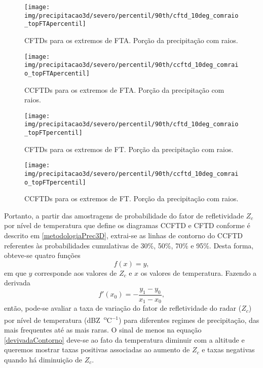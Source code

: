 \begin{sidewaysfigure}%
\centering
\texttt{[image: img/precipitacao3d/severo/percentil/90th/cftd\_10deg\_comraio\_topFTApercentil]}
\caption{CFTDs para os extremos de FTA. Porção da precipitação com raios.}
\label{cftd_fta_com}
\end{sidewaysfigure} 

\begin{sidewaysfigure}%
\centering
\texttt{[image: img/precipitacao3d/severo/percentil/90th/ccftd\_10deg\_comraio\_topFTApercentil]}
\caption{CCFTDs para os extremos de FTA. Porção da precipitação com raios.}
\label{ccftd_fta_com}
\end{sidewaysfigure} 

\begin{sidewaysfigure}%
\centering
\texttt{[image: img/precipitacao3d/severo/percentil/90th/cftd\_10deg\_comraio\_topFTpercentil]}
\caption{CFTDs para os extremos de FT. Porção da precipitação com raios.}
\label{cftd_ft_com}
\end{sidewaysfigure} 

\begin{sidewaysfigure}%
\centering
\texttt{[image: img/precipitacao3d/severo/percentil/90th/ccftd\_10deg\_comraio\_topFTpercentil]}
\caption{CCFTDs para os extremos de FT. Porção da precipitação com raios.}
\label{ccftd_ft_com}
\end{sidewaysfigure} 

Portanto, a partir das amostragens de probabilidade do fator de refletividade $Z_c$ por nível de temperatura que define os diagramas CCFTD e CFTD conforme é descrito em \ref{metodologiaPrec3D},  extrai-se as linhas de contorno do CCFTD referentes às probabilidades cumulativas de 30\%, 50\%, 70\% e 95\%. Desta forma, obteve-se quatro funções 
\begin{equation}
f(x)=y ,
\end{equation} 
em que $y$ corresponde aos valores de $Z_c$ e $x$ os valores de temperatura. Fazendo a derivada 
\begin{equation}
f'(x_0)= - \dfrac{y_1 - y_0}{x_1 - x_0},
\label{devivadaContorno}
\end{equation}
então, pode-se avaliar a taxa de variação do fator de refletividade do radar ($Z_c$) por nível de temperatura (dBZ~\textsuperscript{o}C$^{-1}$) para diferentes regimes de precipitação, das mais frequentes até as mais raras. O sinal de menos na equação \ref{devivadaContorno} deve-se ao fato da temperatura diminuir com a altitude e queremos mostrar taxas positivas associadas ao aumento de $Z_c$ e taxas negativas quando há diminuição de $Z_c$.

